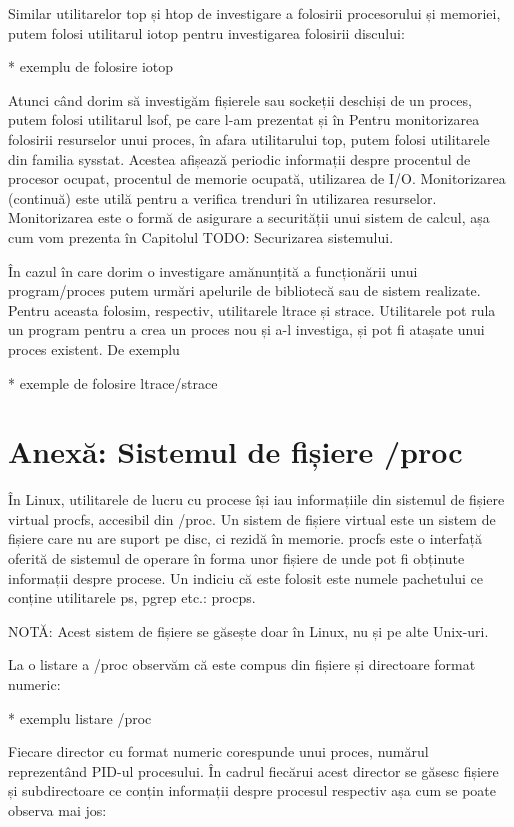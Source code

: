Similar utilitarelor top și htop de investigare a folosirii procesorului și
memoriei, putem folosi utilitarul iotop pentru investigarea folosirii discului:

* exemplu de folosire iotop

Atunci când dorim să investigăm fișierele sau sockeții deschiși de un proces,
putem folosi utilitarul lsof, pe care l-am prezentat și în
 Pentru monitorizarea folosirii
resurselor unui proces, în afara utilitarului top, putem folosi utilitarele din
familia sysstat. Acestea afișează periodic informații despre procentul de
procesor ocupat, procentul de memorie ocupată, utilizarea de I/O. Monitorizarea
(continuă) este utilă pentru a verifica trenduri în utilizarea resurselor.
Monitorizarea este o formă de asigurare a securității unui sistem de calcul, așa
cum vom prezenta în Capitolul TODO: Securizarea sistemului.

În cazul în care dorim o investigare amănunțită a funcționării unui
program/proces putem urmări apelurile de bibliotecă sau de sistem realizate.
Pentru aceasta folosim, respectiv, utilitarele ltrace și strace. Utilitarele pot
rula un program pentru a crea un proces nou și a-l investiga, și pot fi atașate
unui proces existent. De exemplu

* exemple de folosire ltrace/strace

\section{Anexă: Sistemul de fișiere /proc}
\label{sec:procese-proc}

În Linux, utilitarele de lucru cu procese își iau informațiile din sistemul de
fișiere virtual procfs, accesibil din /proc. Un sistem de fișiere virtual este
un sistem de fișiere care nu are suport pe disc, ci rezidă în memorie. procfs
este o interfață oferită de sistemul de operare în forma unor fișiere de unde
pot fi obținute informații despre procese. Un indiciu că este folosit este
numele pachetului ce conține utilitarele ps, pgrep etc.: procps.

NOTĂ: Acest sistem de fișiere se găsește doar în Linux, nu și pe alte Unix-uri.

La o listare a /proc observăm că este compus din fișiere și directoare format numeric:

* exemplu listare /proc

Fiecare director cu format numeric corespunde unui proces, numărul reprezentând
PID-ul procesului. În cadrul fiecărui acest director se găsesc fișiere și
subdirectoare ce conțin informații despre procesul respectiv așa cum se poate
observa mai jos:

